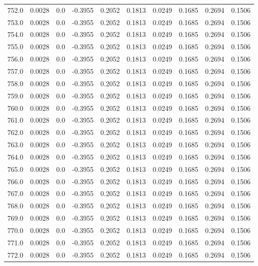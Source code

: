 \begin{longtable}{lrrrrrrrrr}
752.0 & 0.0028 & 0.0 & -0.3955 & 0.2052 & 0.1813 & 0.0249 & 0.1685 & 0.2694 & 0.1506 \\
753.0 & 0.0028 & 0.0 & -0.3955 & 0.2052 & 0.1813 & 0.0249 & 0.1685 & 0.2694 & 0.1506 \\
754.0 & 0.0028 & 0.0 & -0.3955 & 0.2052 & 0.1813 & 0.0249 & 0.1685 & 0.2694 & 0.1506 \\
755.0 & 0.0028 & 0.0 & -0.3955 & 0.2052 & 0.1813 & 0.0249 & 0.1685 & 0.2694 & 0.1506 \\
756.0 & 0.0028 & 0.0 & -0.3955 & 0.2052 & 0.1813 & 0.0249 & 0.1685 & 0.2694 & 0.1506 \\
757.0 & 0.0028 & 0.0 & -0.3955 & 0.2052 & 0.1813 & 0.0249 & 0.1685 & 0.2694 & 0.1506 \\
758.0 & 0.0028 & 0.0 & -0.3955 & 0.2052 & 0.1813 & 0.0249 & 0.1685 & 0.2694 & 0.1506 \\
759.0 & 0.0028 & 0.0 & -0.3955 & 0.2052 & 0.1813 & 0.0249 & 0.1685 & 0.2694 & 0.1506 \\
760.0 & 0.0028 & 0.0 & -0.3955 & 0.2052 & 0.1813 & 0.0249 & 0.1685 & 0.2694 & 0.1506 \\
761.0 & 0.0028 & 0.0 & -0.3955 & 0.2052 & 0.1813 & 0.0249 & 0.1685 & 0.2694 & 0.1506 \\
762.0 & 0.0028 & 0.0 & -0.3955 & 0.2052 & 0.1813 & 0.0249 & 0.1685 & 0.2694 & 0.1506 \\
763.0 & 0.0028 & 0.0 & -0.3955 & 0.2052 & 0.1813 & 0.0249 & 0.1685 & 0.2694 & 0.1506 \\
764.0 & 0.0028 & 0.0 & -0.3955 & 0.2052 & 0.1813 & 0.0249 & 0.1685 & 0.2694 & 0.1506 \\
765.0 & 0.0028 & 0.0 & -0.3955 & 0.2052 & 0.1813 & 0.0249 & 0.1685 & 0.2694 & 0.1506 \\
766.0 & 0.0028 & 0.0 & -0.3955 & 0.2052 & 0.1813 & 0.0249 & 0.1685 & 0.2694 & 0.1506 \\
767.0 & 0.0028 & 0.0 & -0.3955 & 0.2052 & 0.1813 & 0.0249 & 0.1685 & 0.2694 & 0.1506 \\
768.0 & 0.0028 & 0.0 & -0.3955 & 0.2052 & 0.1813 & 0.0249 & 0.1685 & 0.2694 & 0.1506 \\
769.0 & 0.0028 & 0.0 & -0.3955 & 0.2052 & 0.1813 & 0.0249 & 0.1685 & 0.2694 & 0.1506 \\
770.0 & 0.0028 & 0.0 & -0.3955 & 0.2052 & 0.1813 & 0.0249 & 0.1685 & 0.2694 & 0.1506 \\
771.0 & 0.0028 & 0.0 & -0.3955 & 0.2052 & 0.1813 & 0.0249 & 0.1685 & 0.2694 & 0.1506 \\
772.0 & 0.0028 & 0.0 & -0.3955 & 0.2052 & 0.1813 & 0.0249 & 0.1685 & 0.2694 & 0.1506 \\

\end{longtable}

